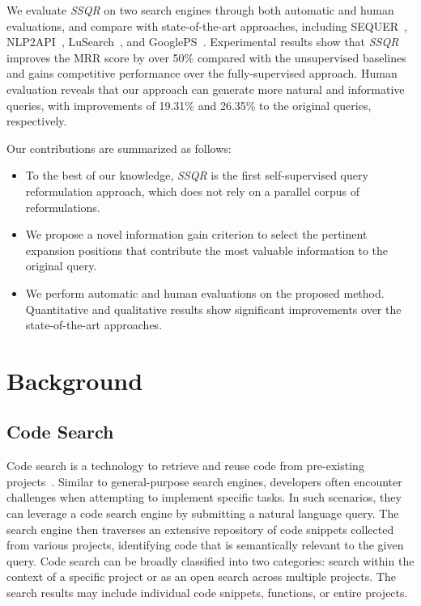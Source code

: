 \documentclass[sigconf,screen]{acmart}
\newcommand{\ourmethod}{\textit{SSQR}\xspace}
\begin{document}
We evaluate \ourmethod on two search engines through both automatic and human evaluations, and compare with state-of-the-art approaches, including SEQUER~\cite{sequer}, NLP2API~\cite{nlp2api}, LuSearch~\cite{lusearch}, and GooglePS~\cite{GooglePS}. Experimental results show that \ourmethod improves the MRR score by over 50\% compared with the unsupervised baselines and gains competitive performance over the fully-supervised approach. 
Human evaluation reveals that our approach can generate more natural and informative queries, with improvements of 19.31\% and 26.35\% to the original queries, respectively. %

Our contributions are summarized as follows:
\begin{itemize}
    \item To the best of our knowledge, \ourmethod is the first self-supervised query reformulation approach, which does not rely on a parallel corpus of reformulations.
    \item We propose a novel information gain criterion to select the pertinent expansion positions that contribute the most valuable information to the original query.
    \item We perform automatic and human evaluations on the proposed method. %
    Quantitative and qualitative results show significant improvements over the state-of-the-art approaches.     %
\end{itemize}



\section{Background}
\subsection{Code Search}
Code search is a technology to retrieve and reuse code from pre-existing projects~\cite{deepcs,ChaiZSG22,YanYCSJ20}. 
Similar to general-purpose search engines, developers often encounter challenges when attempting to implement specific tasks. In such scenarios, they can leverage a code search engine by submitting a natural language query. The search engine then traverses an extensive repository of code snippets collected from various projects, identifying code that is semantically relevant to the given query. Code search can be broadly classified into two categories: search within the context of a specific project or as an open search across multiple projects. The search results may include individual code snippets, functions, or entire projects. 
\end{document}
